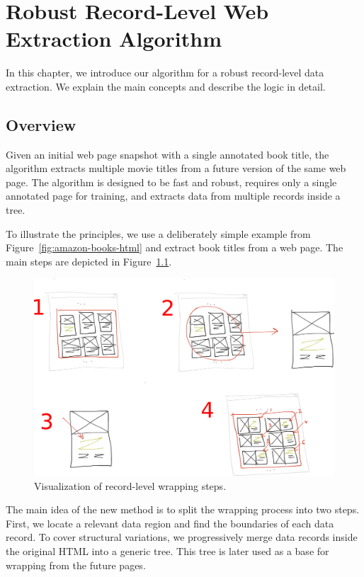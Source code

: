 \chapter{Robust Record-Level Web Extraction Algorithm}
\label{ch:algorithm}

In this chapter, we introduce our algorithm for a robust record-level data extraction. We explain the main concepts and describe the logic in detail.


\section{Overview}

Given an initial web page snapshot with a single annotated book title, the algorithm extracts multiple movie titles from a future version of the same web page. The algorithm is designed to be fast and robust, requires only a single annotated page for training, and extracts data from multiple records inside a tree.

To illustrate the principles, we use a deliberately simple example from Figure~\ref{fig:amazon-books-html} and extract book titles from a web page. The main steps are depicted in Figure~\ref{fig:algorithm}.

\begin{figure}[h]
	\centering
	\includegraphics[width=1.0\textwidth]{figures/algorithm}
	\caption{Visualization of record-level wrapping steps.}
	\label{fig:algorithm}
\end{figure}

The main idea of the new method is to split the wrapping process into two steps. First, we locate a relevant data region and find the boundaries of each data record. To cover structural variations, we progressively merge data records inside the original HTML into a generic tree. This tree is later used as a base for wrapping from the future pages. 

